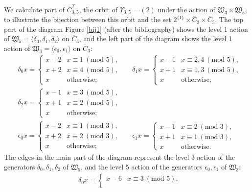 \documentclass[ALCO, Unicode,published]{cedram}
\begin{document}
\begin{exam}
We calculate part of $\overline{C}^\Upsilon_{3,5}$, the orbit of $\Upsilon_{3,5}=(2)$ under the action of $\mathfrak{W}_3\times\mathfrak{W}_5$, to illustrate the bijection between this orbit and the set $2^{\{1\}}\times\overline{C}_3\times\overline{C}_5$. The top part of the diagram Figure \ref{bij1} (after the bibliography) shows the level 1 action of $\mathfrak{W}_5=\langle\delta_0,\delta_1,\delta_2\rangle$ on $\overline{C}_5$, and the left part of the diagram shows the level 1 action of $\mathfrak{W}_3=\langle\epsilon_0,\epsilon_1\rangle$ on $\overline{C}_3$: 
\begin{align*} 
&\delta_0x=\begin{cases}x-2&x\equiv1\:(\text{mod }5),\\
x+2&x\equiv4\:(\text{mod }5),\\
x&\text{otherwise;}\end{cases}
&&\delta_1x=\begin{cases}x-1&x\equiv2,4\:(\text{mod }5),\\
x+1&x\equiv1,3\:(\text{mod }5),\\
x&\text{otherwise;}\end{cases}\\
&\delta_2x=\begin{cases}x-1&x\equiv3\:(\text{mod }5),\\
x+1&x\equiv2\:(\text{mod }5),\\
x&\text{otherwise;}\end{cases}\\
&\epsilon_0x=\begin{cases}x-2&x\equiv1\:(\text{mod }3),\\
x+2&x\equiv2\:(\text{mod }3),\\
x&\text{otherwise;}\end{cases}
&&\epsilon_1x=\begin{cases}x-1&x\equiv2\:(\text{mod }3),\\
x+1&x\equiv1\:(\text{mod }3),\\
x&\text{otherwise.}\end{cases}
\end{align*}
The edges in the main part of the diagram represent the level 3 action of the generators $\delta_0,\delta_1,\delta_2$ of $\mathfrak{W}_5$, and the level 5 action of the generators $\epsilon_0,\epsilon_1$ of $\mathfrak{W}_3$: 
\begin{align*} 
&\delta_0x=\begin{cases}x-6&x\equiv3\:(\text{mod }5),\\

\end{cases}
\end{align*}
\end{exam}
\end{document}
